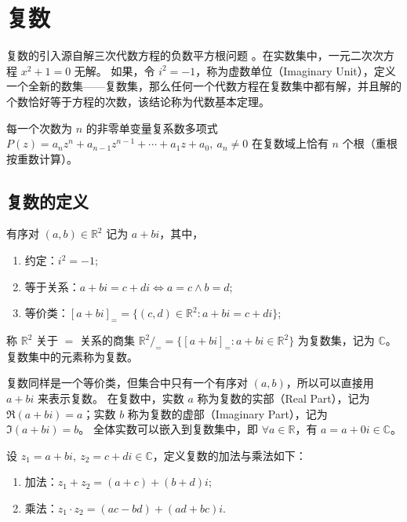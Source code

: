 \section{复数}
复数的引入源自解三次代数方程的负数平方根问题 。在实数集中，一元二次次方程 $x^2 + 1 = 0$ 无解。
如果，令 $i^2=-1$，称为虚数单位（Imaginary Unit），定义一个全新的数集——复数集，那么任何一个代数方程在复数集中都有解，并且解的个数恰好等于方程的次数，该结论称为代数基本定理。

\begin{theorem}
    每一个次数为 $n$ 的非零单变量复系数多项式 $P(z)=a_nz^n + a_{n-1}z^{n-1} + \cdots + a_1z + a_0,\ a_n\neq 0$ 在复数域上恰有 $n$ 个根（重根按重数计算）。
    \label{thm:FundamentalTheoremOfAlgebra}
\end{theorem}

\vspace{1em}

\subsection{复数的定义}

\begin{definition} 有序对 $(a,b)\in\mathbb{R}^2$ 记为 $a+bi$，其中，
    \begin{enumerate}
        \item 约定：$i^2 = -1$;
        \item 等于关系：$a+bi = c+di \Leftrightarrow a=c \land b=d$;
        \item 等价类：$[a+bi]_{=} = \{(c,d)\in\mathbb{R}^2 : a+bi = c+di\}$;
    \end{enumerate}
    称 $\mathbb{R}^2$ 关于 $=$ 关系的商集 $\mathbb{R}^2/_{=}= \{[a+bi]_{=} : a+bi\in\mathbb{R}^2\}$ 为复数集，记为 $\mathbb{C}$。复数集中的元素称为复数。
\end{definition}

\begin{note}
    复数同样是一个等价类，但集合中只有一个有序对 $(a,b)$，所以可以直接用 $a+bi$ 来表示复数。
    在复数中，实数 $a$ 称为复数的实部（Real Part），记为 $\Re(a+bi)=a$；实数 $b$ 称为复数的虚部（Imaginary Part），记为 $\Im(a+bi)=b$。
    全体实数可以嵌入到复数集中，即 $\forall a\in\mathbb{R}$，有 $a =a+0i \in \mathbb{C}$。
\end{note}

\vspace{1em}

\begin{definition}
    设 $z_1=a+bi,\ z_2=c+di\in\mathbb{C}$，定义复数的加法与乘法如下：
    \begin{enumerate}
        \item 加法：$z_1 + z_2 = (a+c) + (b+d)i$;
        \item 乘法：$z_1 \cdot z_2 = (ac - bd) + (ad + bc)i$.
    \end{enumerate}
\end{definition}

